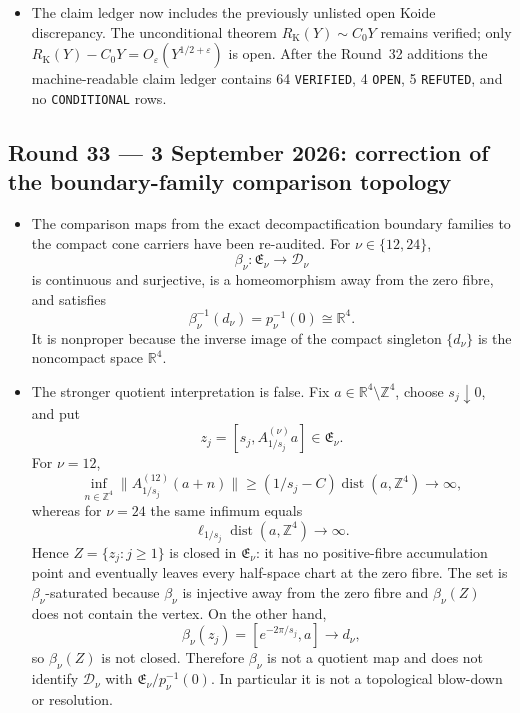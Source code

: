 \begin{itemize}[leftmargin=1.8em]
\item The claim ledger now includes the previously unlisted open Koide
discrepancy.  The unconditional theorem
\(R_{\mathrm K}(Y)\sim C_0Y\) remains verified; only
\(R_{\mathrm K}(Y)-C_0Y=O_\varepsilon(Y^{1/2+\varepsilon})\) is open.  After
the Round~32 additions the machine-readable claim ledger contains 64
\texttt{VERIFIED}, 4 \texttt{OPEN}, 5 \texttt{REFUTED}, and no
\texttt{CONDITIONAL} rows.
\end{itemize}

\subsection*{Round 33 --- 3 September 2026: correction of the
boundary-family comparison topology}

\begin{itemize}[leftmargin=1.8em]
\item The comparison maps from the exact decompactification boundary
families to the compact cone carriers have been re-audited.  For
\(\nu\in\{12,24\}\),
\[
 \beta_\nu:\mathfrak E_\nu\longrightarrow\mathcal D_\nu
\]
is continuous and surjective, is a homeomorphism away from the zero fibre,
and satisfies
\[
 \beta_\nu^{-1}(d_\nu)=p_\nu^{-1}(0)\cong\mathbb R^4.
\]
It is nonproper because the inverse image of the compact singleton
\(\{d_\nu\}\) is the noncompact space \(\mathbb R^4\).

\item The stronger quotient interpretation is false.  Fix
\(a\in\mathbb R^4\setminus\mathbb Z^4\), choose \(s_j\downarrow0\), and put
\[
 z_j=[s_j,A_{1/s_j}^{(\nu)}a]\in\mathfrak E_\nu.
\]
For \(\nu=12\),
\[
 \inf_{n\in\mathbb Z^4}
 \|A_{1/s_j}^{(12)}(a+n)\|
 \geq(1/s_j-C)\operatorname{dist}(a,\mathbb Z^4)\longrightarrow\infty,
\]
whereas for \(\nu=24\) the same infimum equals
\[
 \ell_{1/s_j}\operatorname{dist}(a,\mathbb Z^4)\longrightarrow\infty.
\]
Hence \(Z=\{z_j:j\geq1\}\) is closed in \(\mathfrak E_\nu\): it has no
positive-fibre accumulation point and eventually leaves every half-space
chart at the zero fibre.  The set is \(\beta_\nu\)-saturated because
\(\beta_\nu\) is injective away from the zero fibre and \(\beta_\nu(Z)\)
does not contain the vertex.  On the other hand,
\[
 \beta_\nu(z_j)=[e^{-2\pi/s_j},a]\longrightarrow d_\nu,
\]
so \(\beta_\nu(Z)\) is not closed.  Therefore \(\beta_\nu\) is not a
quotient map and does not identify \(\mathcal D_\nu\) with
\(\mathfrak E_\nu/p_\nu^{-1}(0)\).  In particular it is not a topological
blow-down or resolution.


\end{itemize}
